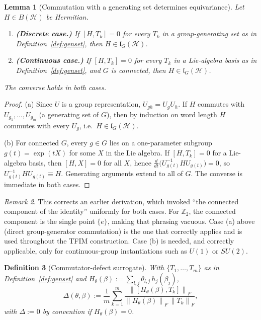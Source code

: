 \documentclass[10pt,twocolumn]{article}
\newtheorem{definition}{Definition}[section]
\newtheorem{lemma}[definition]{Lemma}
\theoremstyle{remark}
\newtheorem{remark}[definition]{Remark}
\newcommand{\Hil}{\mathcal{H}}
\newcommand{\lG}{\mathfrak{l}_G(\Hil)}
\newcommand{\fronorm}[1]{\left\lVert #1 \right\rVert_{F}}
\begin{document}
\begin{lemma}[Commutation with a generating set determines equivariance]
\label{lem:genset}
Let $H \in B(\Hil)$ be Hermitian.
\begin{enumerate}[label=(\alph*), leftmargin=1.4em, itemsep=1pt, topsep=2pt]
\item \textbf{(Discrete case.)} If $[H,T_k]=0$ for every $T_k$ in a group-generating set as in Definition~\ref{def:genset}, then $H \in \lG$.
\item \textbf{(Continuous case.)} If $[H,T_k]=0$ for every $T_k$ in a Lie-algebra basis as in Definition~\ref{def:genset}, and $G$ is connected, then $H \in \lG$.
\end{enumerate}
The converse holds in both cases.
\end{lemma}
\begin{proof}
(a) Since $U$ is a group representation, $U_{gh} = U_g U_h$. If $H$ commutes with $U_{g_1},\ldots,U_{g_m}$ (a generating set of $G$), then by induction on word length $H$ commutes with every $U_g$, i.e.\ $H \in \lG$.

(b) For connected $G$, every $g \in G$ lies on a one-parameter subgroup $g(t) = \exp(tX)$ for some $X$ in the Lie algebra. If $[H,T_k]=0$ for a Lie-algebra basis, then $[H,X]=0$ for all $X$, hence $\frac{d}{dt}\big(U_{g(t)}^{-1} H U_{g(t)}\big) = 0$, so $U_{g(t)}^{-1} H U_{g(t)} \equiv H$. Generating arguments extend to all of $G$. The converse is immediate in both cases.
\end{proof}

\begin{remark}
\label{rem:correction}
This corrects an earlier derivation, which invoked ``the connected component of the identity'' uniformly for both cases. For $\mathbb{Z}_2$, the connected component is the single point $\{e\}$, making that phrasing vacuous. Case (a) above (direct group-generator commutation) is the one that correctly applies and is used throughout the TFIM construction. Case (b) is needed, and correctly applicable, only for continuous-group instantiations such as $U(1)$ or $SU(2)$.
\end{remark}

\begin{definition}[Commutator-defect surrogate]
\label{def:defect}
With $\{T_1,\ldots,T_m\}$ as in Definition~\ref{def:genset} and $H_\theta(\beta) := \sum_{l,j} \theta_{l,j}\, h_j(\beta_j)$,
\begin{equation}
\Delta(\theta,\beta) := \frac{1}{m}\sum_{k=1}^{m} \frac{\fronorm{[H_\theta(\beta), T_k]}}{\fronorm{H_\theta(\beta)}\,\fronorm{T_k}}, \label{eq:8}
\end{equation}
with $\Delta := 0$ by convention if $H_\theta(\beta) = 0$.
\end{definition}
\end{document}
